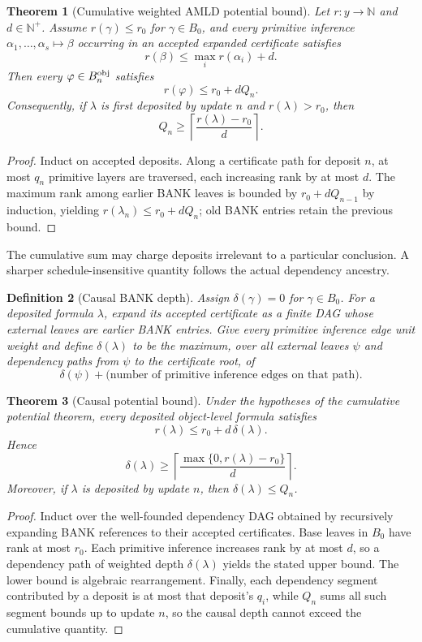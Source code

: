 \documentclass[11pt]{article}
\newtheorem{definition}{Definition}[section]
\newtheorem{theorem}[definition]{Theorem}
\theoremstyle{remark}
\begin{document}
\begin{theorem}[Cumulative weighted AMLD potential bound]
Let $r:y\to\mathbb N$ and $d\in\mathbb N^+$. Assume $r(\gamma)\le r_0$ for $\gamma\in B_0$, and every primitive inference $\alpha_1,\ldots,\alpha_s\mapsto\beta$ occurring in an accepted expanded certificate satisfies
\[
r(\beta)\le\max_i r(\alpha_i)+d.
\]
Then every $\varphi\in B_n^{\rm obj}$ satisfies
\[
r(\varphi)\le r_0+dQ_n.
\]
Consequently, if $\lambda$ is first deposited by update $n$ and $r(\lambda)>r_0$, then
\[
Q_n\ge\left\lceil\frac{r(\lambda)-r_0}{d}\right\rceil.
\]
\end{theorem}
\begin{proof}
Induct on accepted deposits. Along a certificate path for deposit $n$, at most $q_n$ primitive layers are traversed, each increasing rank by at most $d$. The maximum rank among earlier BANK leaves is bounded by $r_0+dQ_{n-1}$ by induction, yielding $r(\lambda_n)\le r_0+dQ_n$; old BANK entries retain the previous bound.
\end{proof}

The cumulative sum may charge deposits irrelevant to a particular conclusion. A sharper schedule-insensitive quantity follows the actual dependency ancestry.

\begin{definition}[Causal BANK depth]
Assign $\delta(\gamma)=0$ for $\gamma\in B_0$. For a deposited formula $\lambda$, expand its accepted certificate as a finite DAG whose external leaves are earlier BANK entries. Give every primitive inference edge unit weight and define $\delta(\lambda)$ to be the maximum, over all external leaves $\psi$ and dependency paths from $\psi$ to the certificate root, of
\[
\delta(\psi)+\text{(number of primitive inference edges on that path)}.
\]
\end{definition}

\begin{theorem}[Causal potential bound]
Under the hypotheses of the cumulative potential theorem, every deposited object-level formula satisfies
\[
r(\lambda)\le r_0+d\,\delta(\lambda).
\]
Hence
\[
\delta(\lambda)\ge
\left\lceil\frac{\max\{0,r(\lambda)-r_0\}}{d}\right\rceil.
\]
Moreover, if $\lambda$ is deposited by update $n$, then $\delta(\lambda)\le Q_n$.
\end{theorem}
\begin{proof}
Induct over the well-founded dependency DAG obtained by recursively expanding BANK references to their accepted certificates. Base leaves in $B_0$ have rank at most $r_0$. Each primitive inference increases rank by at most $d$, so a dependency path of weighted depth $\delta(\lambda)$ yields the stated upper bound. The lower bound is algebraic rearrangement. Finally, each dependency segment contributed by a deposit is at most that deposit's $q_i$, while $Q_n$ sums all such segment bounds up to update $n$, so the causal depth cannot exceed the cumulative quantity.
\end{proof}
\end{document}
